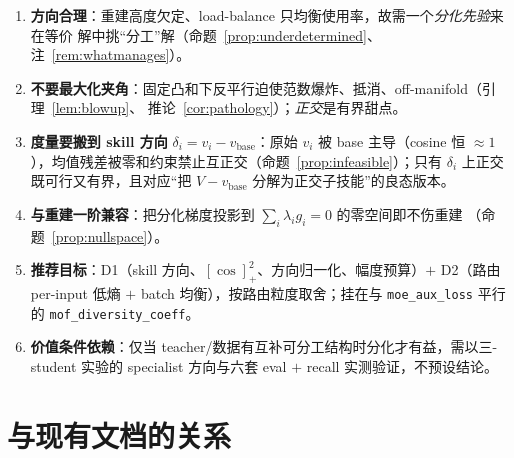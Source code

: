 \documentclass[11pt,a4paper]{article}
\newcommand{\base}{\mathrm{base}}
\newcommand{\vbase}{v_{\base}}
\theoremstyle{definition}
\begin{document}
\begin{tcolorbox}[colback=yellow!5,colframe=yellow!60!black,title=\textbf{要点}]
\begin{enumerate}[leftmargin=1.5em]
\item \textbf{方向合理}：重建高度欠定、load-balance 只均衡使用率，故需一个\emph{分化先验}来在等价
解中挑``分工''解（命题~\ref{prop:underdetermined}、注~\ref{rem:whatmanages}）。
\item \textbf{不要最大化夹角}：固定凸和下反平行迫使范数爆炸、抵消、off-manifold（引理~\ref{lem:blowup}、
推论~\ref{cor:pathology}）；\emph{正交}是有界甜点。
\item \textbf{度量要搬到 skill 方向} $\delta_i=v_i-\vbase$：原始 $v_i$ 被 base 主导（cosine 恒
$\approx1$），均值残差被零和约束禁止互正交（命题~\ref{prop:infeasible}）；只有 $\delta_i$ 上正交
既可行又有界，且对应``把 $V-\vbase$ 分解为正交子技能''的良态版本。
\item \textbf{与重建一阶兼容}：把分化梯度投影到 $\sum_i\lambda_i g_i=0$ 的零空间即不伤重建
（命题~\ref{prop:nullspace}）。
\item \textbf{推荐目标}：D1（skill 方向、$[\cos]_+^2$、方向归一化、幅度预算）$+$ D2（路由 per-input
低熵 $+$ batch 均衡），按路由粒度取舍；挂在与 \texttt{moe\_aux\_loss} 平行的
\texttt{mof\_diversity\_coeff}。
\item \textbf{价值条件依赖}：仅当 teacher/数据有互补可分工结构时分化才有益，需以三-student 实验的
specialist 方向与六套 eval $+$ recall 实测验证，不预设结论。
\end{enumerate}
\end{tcolorbox}

\section{与现有文档的关系}
\label{sec:relation}
\end{document}
